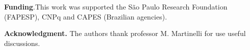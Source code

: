 \documentclass[aps,prl,twocolumn,groupedaddress]{revtex4-1}
\begin{document}
\textbf{Funding}.This work was supported the São Paulo Research Foundation (FAPESP), CNPq and CAPES (Brazilian agencies).

\textbf{Acknowledgment.} The authors thank professor M. Martinelli for use useful discussions.



\end{document}
